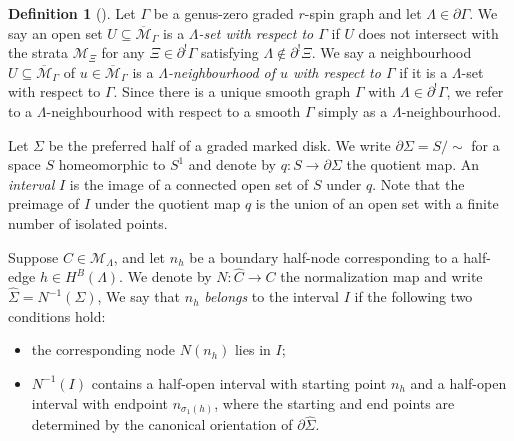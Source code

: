 \documentclass[11pt]{amsart}
\theoremstyle{definition}
\newtheorem{definition}[dummy]{Definition}
\theoremstyle{remark}
\newcommand{\<}{\left<}
\renewcommand{\>}{\right>}
\numberwithin{equation}{section}
\def\Mbar{{\overline{\mathcal M}}}
\begin{document}
\begin{definition}[{\cite[Definition 3.4]{BCT2}}]\label{def positive neighbourhoods}
Let $\Gamma$ be a genus-zero graded $r$-spin graph and let $\Lambda \in \partial\Gamma$.  
We say an open set $U\subseteq \Mbar_\Gamma$ is a \textit{$\Lambda$-set with respect to $\Gamma$} if $U$ does not intersect with the strata ${\mathcal{M}}_\Xi$  for any $\Xi \in\partial^! \Gamma $ satisfying $\Lambda\notin \partial^!\Xi$.
We say a neighbourhood $U\subseteq\Mbar_\Gamma$ of $u\in\Mbar_\Gamma$ is a \textit{$\Lambda$-neighbourhood of $u$ with respect to $\Gamma$} if it is a $\Lambda$-set with respect to $\Gamma$.  Since there is a unique smooth graph $\Gamma$ with $\Lambda\in\partial^!\Gamma$, we refer to a $\Lambda$-neighbourhood with respect to a smooth $\Gamma$ simply as a $\Lambda$-neighbourhood.

Let $\Sigma$ be the preferred half of a graded marked disk. We write $\partial \Sigma = S/\sim$ for a space $S$ homeomorphic to $S^1$ and denote by $q\colon S \to \partial \Sigma$ the quotient map. An \emph{interval} $I$ is the image of a connected open set of $S$ under $q$. Note that the preimage of $I$ under the quotient map $q$ is the union of an open set with a finite number of isolated points.

Suppose $C\in{\mathcal{M}}_\Lambda$, and let $n_h$ be a boundary half-node corresponding to a half-edge $h\in H^B(\Lambda)$. We denote by $N: \widehat{C} \to C$ the normalization map and write $\widehat{\Sigma} = N^{-1}(\Sigma)$, We say that $n_h$ \textit{belongs} to the interval $I$ if the following two conditions %
hold:
\begin{itemize}
    \item the corresponding %
node $N(n_{h})$ lies in $I$;
    \item  $N^{-1}(I)$ contains a half-open interval with starting point $n_h$ and a half-open interval with endpoint $n_{\sigma_1(h)}$, where the starting and end points are determined by the canonical orientation of $\partial\widehat{\Sigma}$.
\end{itemize}


\end{definition}
\end{document}
